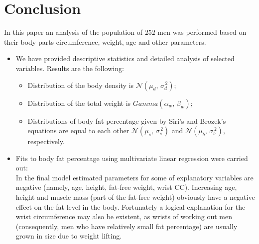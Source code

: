 \documentclass[11pt,american,american]{article}
\begin{document}
\section{Conclusion}

In this paper an analysis of the population of $252$ men was performed based on their body parts circumference, weight, age and other parameters.

\begin{itemize}
	\item We have provided descriptive statistics and detailed analysis of selected variables. Results are the following:
		\begin{itemize}
			\item Distribution of the body density is $\mathcal{N} (\mu_{d},\,\sigma^{\,2}_{d})$;
			\item Distribution of the total weight is $Gamma(\alpha_{w}, \, \beta_{w})$;
			\item Distributions of body fat percentage given by Siri's and Brozek's equations are equal to each other $\mathcal{N} (\mu_{s},\,\sigma^{\,2}_{s})$ and $\mathcal{N} (\mu_{b},\,\sigma^{\,2}_{b})$, respectively. 
		\end{itemize}
	\item Fits to body fat percentage using multivariate linear regression were carried out: \\
	In the final model estimated parameters for some of explanatory variables are negative (namely, age, height, fat-free weight, wrist CC). Increasing age, height and muscle mass (part of the fat-free weight) obviously have a negative effect on the fat level in the body. Fortunately a logical explanation for the wrist circumference may also be existent, as wrists of working out men (consequently, men who have relatively small fat percentage) are usually grown in size due to weight lifting.
\end{itemize}

%
%
%
%
\end{document}
